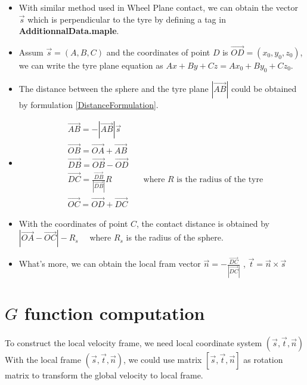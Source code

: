 \begin{itemize}
\item With similar method used in Wheel Plane contact, we can obtain the vector $\vec{s}$ which is perpendicular to the tyre by defining a tag in \textbf{AdditionnalData.maple}.
\item Assum $\vec{s}=(A,B,C)$ and the coordinates of point $D$ is $\overrightarrow{OD}=(x_0,y_0,z_0)$, we can write the tyre plane equation as $Ax+By+Cz=Ax_0+By_0+Cz_0$.
\item The distance between the sphere and the tyre plane $\left| \overrightarrow{AB} \right|$ could be obtained by formulation \eqref{DistanceFormulation}. 
\item \begin{eqnarray}
      &\overrightarrow{AB}=-\left| \overrightarrow{AB} \right| \overrightarrow{s}& \\
      &\overrightarrow{OB}=\overrightarrow{OA}+\overrightarrow{AB}& \\
      &\overrightarrow{DB}=\overrightarrow{OB}-\overrightarrow{OD}& \\
      &\overrightarrow{DC}=\frac{\overrightarrow{DB}}{\left| \overrightarrow{DB} \right|}R& \quad \text{where $R$ is the radius of the tyre}\\ 
      &\overrightarrow{OC}=\overrightarrow{OD}+\overrightarrow{DC}&
      \end{eqnarray}
\item With the coordinates of point $C$, the contact distance is obtained by $\left| \overrightarrow{OA}-\overrightarrow{OC} \right|-R_s \quad$ where $R_s$ is the radius of the sphere. 
\item What's more, we can obtain the local fram vector $\vec{n}=-\frac{\overrightarrow{DC}}{\left| \overrightarrow{DC} \right|}$ , $\vec{t}=\vec{n} \times \vec{s}$
\end{itemize}

\section{$G$ function computation}

To construct the local velocity frame, we need local coordinate system $(\vec{s},\vec{t},\vec{n})$ \\


With the local frame $(\vec{s},\vec{t},\vec{n})$, we could use matrix $[\vec{s},\vec{t},\vec{n}]$ as rotation matrix to transform the global velocity to local frame.\\


